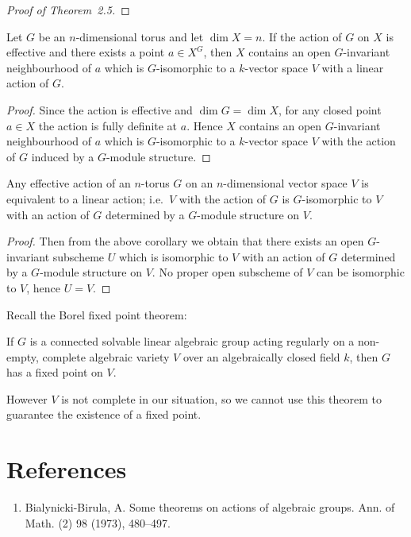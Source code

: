 \documentclass[12pt]{article}
\begin{document}
\begin{proof}
[Proof of Theorem~2.5]
\end{proof}

\begin{corollary}
Let $G$ be an $n$-dimensional torus and let $\dim X = n$.
If the action of $G$ on $X$ is effective and there exists a point $a \in X^G$, 
then $X$ contains an open $G$-invariant neighbourhood of $a$ which is 
$G$-isomorphic to a $k$-vector space $V$ with a linear action of $G$.
\end{corollary}

\begin{proof}
Since the action is effective and $\dim G = \dim X$, for any closed point 
$a \in X$ the action is fully definite at $a$. Hence $X$ contains an open 
$G$-invariant neighbourhood of $a$ which is $G$-isomorphic to a $k$-vector 
space $V$ with the action of $G$ induced by a $G$-module structure.
\end{proof}

\begin{corollary}
Any effective action of an $n$-torus $G$ on an 
$n$-dimensional vector space $V$ is equivalent to a linear action; 
i.e.\ $V$ with the action of $G$ is $G$-isomorphic to $V$ with an action 
of $G$ determined by a $G$-module structure on $V$.
\end{corollary}

\begin{proof}
Then from the above corollary we obtain that there exists an open 
$G$-invariant subscheme $U$ which is isomorphic to $V$ with an action of $G$ 
determined by a $G$-module structure on $V$. No proper open subscheme of $V$ 
can be isomorphic to $V$, hence $U = V$.
\end{proof}

\begin{remark}
Recall the Borel fixed point theorem:
\begin{theorem}
    If $G$ is a connected solvable linear algebraic group acting regularly on a non-empty, complete algebraic variety $V$ over an algebraically closed field $k$, then $G$ has a fixed point on $V$.    
\end{theorem}
However $V$ is not complete in our situation, so we cannot use this theorem to guarantee the existence of a fixed point.
\end{remark}

\section{References}
\begin{enumerate}
    \item Bialynicki-Birula, A. Some theorems on actions of algebraic groups. Ann. of Math. (2) 98 (1973), 480–497.
\end{enumerate}
\end{document}
